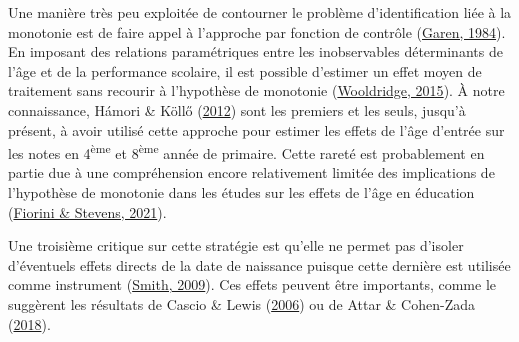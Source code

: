 \documentclass[
]{book}
\begin{document}
Une manière très peu exploitée de contourner le problème d'identification liée à la monotonie est de faire appel à l'approche par fonction de contrôle (\protect\hyperlink{ref-GAR:84}{Garen, 1984}). En imposant des relations paramétriques entre les inobservables déterminants de l'âge et de la performance scolaire, il est possible d'estimer un effet moyen de traitement sans recourir à l'hypothèse de monotonie (\protect\hyperlink{ref-WOO:15}{Wooldridge, 2015}). À notre connaissance, Hámori \& Köllő (\protect\hyperlink{ref-HAM:KOL:12}{2012}) sont les premiers et les seuls, jusqu'à présent, à avoir utilisé cette approche pour estimer les effets de l'âge d'entrée sur les notes en 4\textsuperscript{ème} et 8\textsuperscript{ème} année de primaire. Cette rareté est probablement en partie due à une compréhension encore relativement limitée des implications de l'hypothèse de monotonie dans les études sur les effets de l'âge en éducation (\protect\hyperlink{ref-FIO:STE:21}{Fiorini \& Stevens, 2021}).

\quad Une troisième critique sur cette stratégie est qu'elle ne permet pas d'isoler d'éventuels effets directs de la date de naissance puisque cette dernière est utilisée comme instrument (\protect\hyperlink{ref-SMI:09}{Smith, 2009}). Ces effets peuvent être importants, comme le suggèrent les résultats de Cascio \& Lewis (\protect\hyperlink{ref-CAS:LEW:06}{2006}) ou de Attar \& Cohen-Zada (\protect\hyperlink{ref-ATT:COH:18}{2018}).
\end{document}
